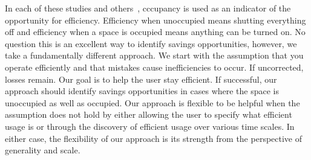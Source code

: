 In each of these studies and others~\cite{AgarwalBDGW11,buildanomaly}, cccupancy is used as an indicator of 
the opportunity for efficiency.  Efficiency
when unoccupied means shutting everything off and efficiency when a space is occupied means anything
can be turned on.  No question this is an excellent way to identify savings opportunities, however, we
take a fundamentally different approach.  We start with the assumption that you operate efficiently and that mistakes
cause inefficiencies to occur.  If uncorrected, losses remain.  Our goal is to help the user stay efficient.
If successful, our approach should identify savings opportunities in cases where the space is unoccupied as well 
as occupied.   Our approach is flexible to be helpful when the assumption does not hold by either allowing the
user to specify what efficient usage is or through the discovery of efficient usage over various time scales.
In either case, the flexibility of our approach is its strength from the perspective of generality and scale.



